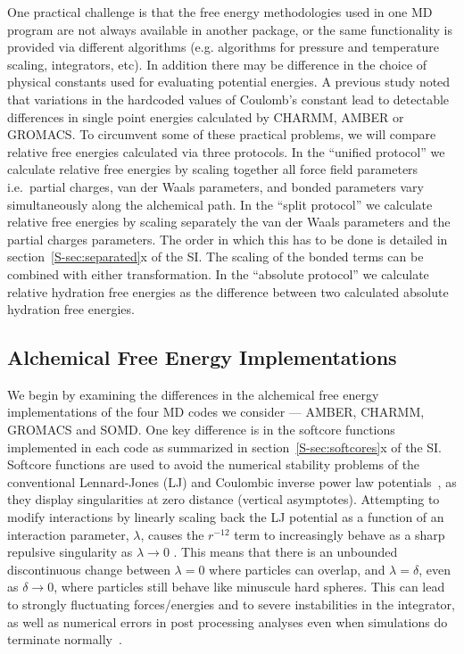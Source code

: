 \documentclass[journal=jctcce,manuscript=article]{achemso}
\begin{document}
{\color{blue}
One practical challenge is that the free energy methodologies
used in one MD program are not always available in another
package, or the same functionality is provided via different algorithms (e.g. algorithms for pressure and temperature 
scaling, integrators, etc).  In addition there may be difference in the  choice of physical constants used for evaluating potential energies. A previous study noted that variations in the hardcoded values of Coulomb's constant lead to detectable differences in single point energies calculated by CHARMM, AMBER or GROMACS.\cite{Shirts2017,SOMDcoulomb}  
To circumvent some of these practical problems, }
we will compare relative free energies calculated via three
protocols.  In the ``unified protocol'' we calculate relative free
energies by scaling together all force field parameters i.e.\ partial
charges, van der Waals parameters, and bonded parameters vary
simultaneously along the alchemical path.  In the ``split protocol''
we calculate relative free energies by scaling separately the van der
Waals parameters and the partial charges parameters.  The order in
which this has to be done is detailed in
section~\ref{S-sec:separated}x of the SI.  The scaling of the bonded
terms can be combined with either transformation.  In the ``absolute
protocol'' we calculate relative hydration free energies as the
difference between two calculated absolute hydration free energies.

\subsection{Alchemical Free Energy Implementations}
\label{sec:afe_impl}

We begin by examining the differences in the alchemical free energy
implementations of the four MD codes we consider --- AMBER, CHARMM, GROMACS and
SOMD.  One key difference is in the softcore
functions~\cite{beutler_avoiding_1994, zacharias_separationshifted_1994}
implemented in each code as summarized in section~\ref{S-sec:softcores}x of the
SI.  Softcore functions are used to avoid the numerical
stability problems of the conventional Lennard-Jones (LJ) and Coulombic inverse power law
potentials~\cite{ISI:A1993MB07100015,steinbrecher_nonlinear_2007}, as they display singularities at
zero distance (vertical asymptotes).  Attempting to modify interactions by
linearly scaling back the LJ potential as a function of an
interaction parameter, $\lambda$, causes the $r^{-12}$ term to increasingly behave
as a sharp repulsive singularity as $\lambda\rightarrow 0$ \cite{ISI:A1993MB07100015}.  This means that there
is an unbounded discontinuous change between $\lambda = 0$ where particles can overlap,
and $\lambda = \delta$, even as $\delta \rightarrow 0$, where particles still
behave like minuscule hard spheres.  This can lead to strongly
fluctuating forces/energies and to severe instabilities in the integrator, as
well as numerical errors in post processing analyses even when simulations do
terminate normally~\cite{beutler_avoiding_1994,
zacharias_separationshifted_1994, steinbrecher_nonlinear_2007}.
\end{document}
